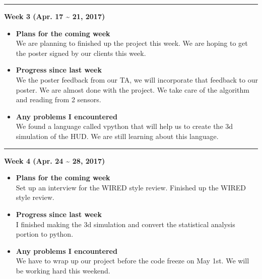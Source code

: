 	\rule{\textwidth}{0.5pt}

	\begin{center}
		\textbf{Week 3 (Apr. 17 {\textasciitilde{}} 21, 2017)}
	\end{center}
	\begin{itemize}
		\item \textbf{Plans for the coming week}
		\\We are planning to finished up the project this week. We are hoping to get the poster signed by our clients this week. \\

		\item \textbf{Progress since last week}
		\\We the poster feedback from our TA, we will incorporate that feedback to our poster. We are almost done with the project. We take care of the algorithm and reading from 2 sensors. \\

		\item \textbf{Any problems I encountered}
		\\ We found a language called vpython that will help us to create the 3d simulation of the HUD. We are still learning about this language.\\
	\end{itemize}

	\rule{\textwidth}{0.5pt}

	\begin{center}
		\textbf{Week 4 (Apr. 24 {\textasciitilde{}} 28, 2017)}
	\end{center}
	\begin{itemize}
		\item \textbf{Plans for the coming week}
		\\Set up an interview for the WIRED style review. Finished up the WIRED style review. \\

		\item \textbf{Progress since last week}
		\\I finished making the 3d simulation and convert the statistical analysis portion to python. \\

		\item \textbf{Any problems I encountered}
		\\We have to wrap up our project before the code freeze on May 1st. We will be working hard this weekend.\\
	\end{itemize}

